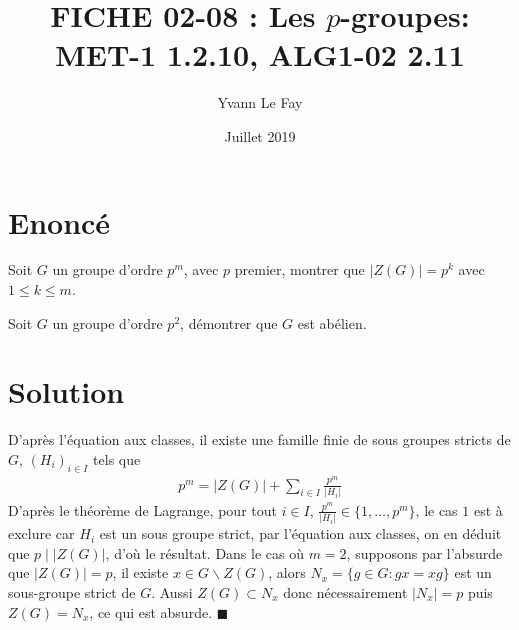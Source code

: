 \documentclass{article}
\newcommand*{\QED}{\hfill\ensuremath{\blacksquare}}%
\begin{document}
\title{FICHE 02-08 : Les $p$-groupes: MET-1 1.2.10, ALG1-02 2.11}
\author{Yvann Le Fay}
\date{Juillet 2019}
\maketitle
\section*{Enoncé}
Soit $G$ un groupe d'ordre $p^m$, avec $p$ premier, montrer que $|Z(G)|=p^k$ avec $1\leq k \leq m$.

Soit $G$ un groupe d'ordre $p^2$, démontrer que $G$ est abélien.
\section*{Solution}
D'après l'équation aux classes, il existe une famille finie de sous groupes stricts de $G$, $(H_i)_{i\in I}$ tels que
\begin{align*}
p^m = |Z(G)| + \sum_{i\in I}\frac{p^m}{|H_i|}
\end{align*}
D'après le théorème de Lagrange, pour tout $i\in I$, $\frac{p^m}{|H_i|}\in \{1,\ldots,p^m\}$, le cas $1$ est à exclure car $H_i$ est un sous groupe strict, par l'équation aux classes, on en déduit que $p\mid |Z(G)|$, d'où le résultat. Dans le cas où $m=2$, supposons par l'absurde que $|Z(G)| = p$, il existe $x\in G\backslash Z(G)$, alors $N_x = \{g\in G : gx=xg\}$ est un sous-groupe strict de $G$. Aussi $Z(G)\subset N_x$ donc nécessairement $|N_x|=p$ puis $Z(G)=N_x$, ce qui est absurde.
\QED
\end{document}
